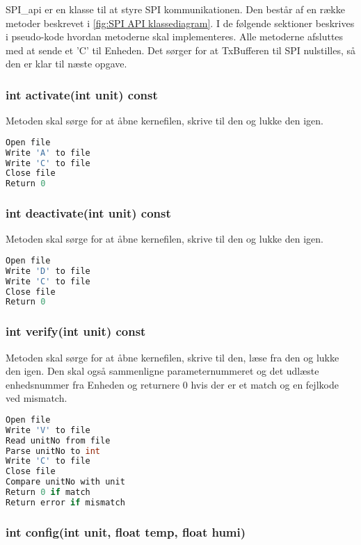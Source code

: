 
SPI\_api er en klasse til at styre SPI kommunikationen. Den består af en række metoder beskrevet i \ref{fig:SPI API klassediagram}. I de følgende sektioner beskrives i pseudo-kode hvordan metoderne skal implementeres. Alle metoderne afsluttes med at sende et 'C' til Enheden. Det sørger for at TxBufferen til SPI nulstilles, så den er klar til næste opgave.

\subsubsection*{int activate(int unit) const}

Metoden skal sørge for at åbne kernefilen, skrive til den og lukke den igen.

\begin{lstlisting}[language=C]
Open file
Write 'A' to file
Write 'C' to file
Close file
Return 0
\end{lstlisting} 
\subsubsection*{int deactivate(int unit) const}

Metoden skal sørge for at åbne kernefilen, skrive til den og lukke den igen.

\begin{lstlisting}[language=C]
Open file
Write 'D' to file
Write 'C' to file
Close file
Return 0
\end{lstlisting} 
\subsubsection*{int verify(int unit) const} 

Metoden skal sørge for at åbne kernefilen, skrive til den, læse fra den og lukke den igen.
Den skal også sammenligne parameternummeret og det udlæste enhedsnummer fra Enheden og returnere 0 hvis der er et match og en fejlkode ved mismatch.

\begin{lstlisting}[language=C]
Open file
Write 'V' to file
Read unitNo from file
Parse unitNo to int
Write 'C' to file
Close file
Compare unitNo with unit
Return 0 if match
Return error if mismatch
\end{lstlisting} 
\subsubsection*{int config(int unit, float temp, float humi)} 

